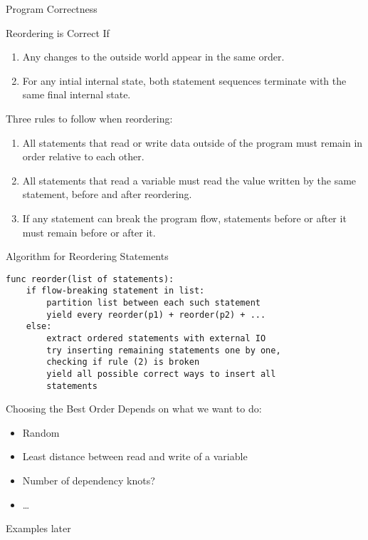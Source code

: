 \begin{frame}{Program Correctness}
\begin{block}{Reordering is Correct If}
\begin{enumerate}
\item Any changes to the outside world appear in the same order.
\item For any intial internal state, both statement sequences terminate with the same final internal state.
\end{enumerate}
\end{block}

\pause

Three rules to follow when reordering:
\begin{enumerate}
\item All statements that read or write data outside of the program must remain in order relative to each other.
\item All statements that read a variable must read the value written by the same statement, before and after reordering.
\item If any statement can break the program flow, statements before or after it must remain before or after it.
\end{enumerate}
\end{frame}

\begin{frame}[fragile]{Algorithm for Reordering Statements}

\small\begin{verbatim}
func reorder(list of statements):
    if flow-breaking statement in list:
        partition list between each such statement
        yield every reorder(p1) + reorder(p2) + ...
    else:
        extract ordered statements with external IO
        try inserting remaining statements one by one,
        checking if rule (2) is broken
        yield all possible correct ways to insert all
        statements
\end{verbatim}
\end{frame}

\begin{frame}{Choosing the Best Order}
Depends on what we want to do:
\begin{itemize}
\item Random
\item Least distance between read and write of a variable
\item Number of dependency knots?
\item \ldots
\end{itemize}

Examples later
\end{frame}

